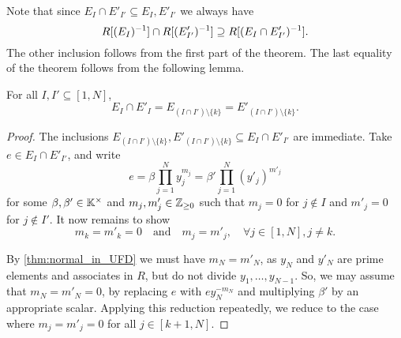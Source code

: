 Note that since $E_I \cap E'_{I'} \subseteq E_I, E'_{I'}$ we always have
\begin{equation*}
	R[(E_I)^{-1}] \cap R[(E'_{I'})^{-1}] \supseteq R[(E_I \cap E'_{I'})^{-1}].
\end{equation*}
%
The other inclusion follows from the first part of the theorem. The last equality of
the theorem follows from the following lemma.
\begin{lemma}
	For all $I, I' \subseteq [1, N]$,
	\begin{equation*}
		E_I \cap E'_I = E_{(I \cap I')\setminus \{k\}} = E'_{(I \cap I') \setminus \{k\}}.
	\end{equation*}
\end{lemma}
\begin{proof}
	The inclusions $E_{(I \cap I')\setminus \{k\}}, E'_{(I \cap I') \setminus \{k\}}
		\subseteq E_I \cap E'_{I'}$ are immediate. Take $e \in E_I \cap E'_{I'}$, and write
	\begin{equation*}
		e = \beta \prod_{j=1}^N y_j^{m_j} = \beta' \prod_{j=1}^N (y'_j)^{m'_j}
	\end{equation*}
	for some $\beta, \beta' \in \mathbb{K}^\times$ and $m_j, m'_j\in \mathbb{Z}_{\geq 0}$ such that
	$m_j = 0$ for $j \notin I$ and $m'_j = 0$ for $j \notin I'$. It now remains to show
	\begin{equation*}
		m_k = m'_k = 0 \quad \text{and}\quad m_j = m'_j, \quad \forall j \in [1, N], j\neq k.
	\end{equation*}

	By \cref{thm:normal_in_UFD} we must have $m_N = m'_N$, as $y_N$ and $y'_N$ are prime
	elements and associates in $R$, but do not divide $y_1, \dots, y_{N-1}$. So, we may
	assume that $m_N = m'_N = 0$, by replacing $e$ with $e y_N^{-m_N}$ and multiplying
	$\beta'$ by an appropriate scalar. Applying this reduction repeatedly, we reduce to the
	case where $m_j = m'_j = 0$ for all $j \in [k+1, N]$.


\end{proof}
